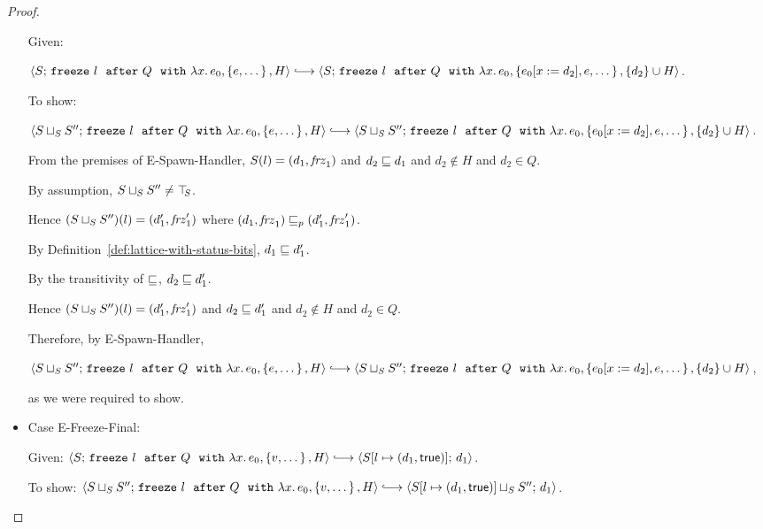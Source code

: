 \begin{proof}
\begin{itemize}
      Given:

      $\config{S}{\freezeafterfull{l}{Q}{\lam{x}{e_0}}{\setof{e,
            \dots}}{H}} \parstepsto
      \config{S}{\freezeafterfull{l}{Q}{\lam{x}{e_0}}{\setof{\subst{e_0}{x}{d_2},
            e, \dots}} {\{d_2\}\cup H}}$.

      To show:

      $\config{\lubstore{S}{S''}}{\freezeafterfull{l}{Q}{\lam{x}{e_0}}{\setof{e,
            \dots}}{H}} \parstepsto
      \config{\lubstore{S}{S''}}{\freezeafterfull{l}{Q}{\lam{x}{e_0}}{\setof{\subst{e_0}{x}{d_2},
            e, \dots}} {\{d_2\}\cup H}}$.

      From the premises of {\sc E-Spawn-Handler}, $S(l) =
      (d_1, \mathit{frz}_1)$ and $d_2 \sqsubseteq d_1$ and $d_2 \notin
      H$ and $d_2 \in Q$.

      By assumption, $S \sqcup_{S} S'' \neq \top\hspace{-0.85mm}_{S}$.

      Hence $(S \sqcup_{S} S'')(l) = (d'_1, \mathit{frz}'_1)$ where
      $(d_1, \mathit{frz}_1) \sqsubseteq_p (d'_1, \mathit{frz}'_1)$.

      By Definition~\ref{def:lattice-with-status-bits}, $d_1 \sqsubseteq
      d'_1$.

      By the transitivity of $\sqsubseteq$, $d_2 \sqsubseteq d'_1$.

      Hence $(S \sqcup_{S} S'')(l) =
      (d'_1, \mathit{frz}'_1)$ and $d_2 \sqsubseteq d'_1$ and $d_2 \notin
      H$ and $d_2 \in Q$.

      Therefore, by {\sc E-Spawn-Handler},

      $\config{\lubstore{S}{S''}}{\freezeafterfull{l}{Q}{\lam{x}{e_0}}{\setof{e,
            \dots}}{H}} \parstepsto
      \config{\lubstore{S}{S''}}{\freezeafterfull{l}{Q}{\lam{x}{e_0}}{\setof{\subst{e_0}{x}{d_2},
            e, \dots}} {\{d_2\}\cup H}}$,

      as we were required to show.

    \item Case {\sc E-Freeze-Final}:



      Given:
      $\config{S}{\freezeafterfull{l}{Q}{\lam{x}{e_0}}{\setof{v,
            \dots}}{H}} \parstepsto
      \config{\extS{S}{l}{d_1}{\frozentrue}}{d_1}$.

      To show:
      $\config{\lubstore{S}{S''}}{\freezeafterfull{l}{Q}{\lam{x}{e_0}}{\setof{v,
            \dots}}{H}} \parstepsto
      \config{\lubstore{\extS{S}{l}{d_1}{\frozentrue}}{S''}}{d_1}$.


\end{itemize}
\end{proof}
